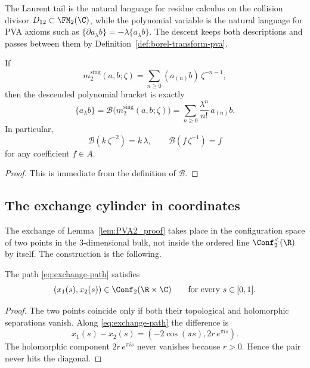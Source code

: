 \begin{remark}
The Laurent tail is the natural language for residue calculus on the collision divisor
$D_{12}\subset\FM_2(\C)$, while the polynomial variable is the natural language for
PVA axioms such as
$\{\partial a_\lambda b\}=-\lambda\{a_\lambda b\}$. The descent keeps both
descriptions and passes between them by Definition~\ref{def:borel-transform-pva}.
\end{remark}

\begin{lemma}
\label{lem:two-point-dictionary}
If
\[
m_2^{\mathrm{sing}}(a,b;\zeta)=\sum_{n\ge0}(a_{(n)}b)\,\zeta^{-n-1},
\]
then the descended polynomial bracket is exactly
\[
\{a_\lambda b\}=\mathcal B\bigl(m_2^{\mathrm{sing}}(a,b;\zeta)\bigr)
=
\sum_{n\ge0}\frac{\lambda^n}{n!}\,a_{(n)}b.
\]
In particular,
\[
\mathcal B(k\,\zeta^{-2})=k\,\lambda,
\qquad
\mathcal B(f\,\zeta^{-1})=f
\]
for any coefficient $f\in A$.
\end{lemma}

\begin{proof}
This is immediate from the definition of $\mathcal B$.
\end{proof}

\subsection{The exchange cylinder in coordinates}

The exchange of Lemma~\ref{lem:PVA2_proof} takes place in the
configuration space of two points in the $3$-dimensional bulk, not
inside the ordered line $\Conf_2^{<}(\R)$ by itself. The construction
is the following.

\begin{proposition}
\label{prop:exchange-path-avoids-diagonal}
The path \eqref{eq:exchange-path} satisfies
\[
(x_1(s),x_2(s))\in \Conf_2(\R\times\C)\qquad\text{for every }s\in[0,1].
\]
\end{proposition}

\begin{proof}
The two points coincide only if both their topological and holomorphic separations vanish.
Along \eqref{eq:exchange-path} the difference is
\[
x_1(s)-x_2(s)=(-2\cos(\pi s),2r\,e^{\pi i s}).
\]
The holomorphic component $2r\,e^{\pi i s}$ never vanishes because $r>0$.
Hence the pair never hits the diagonal.
\end{proof}

